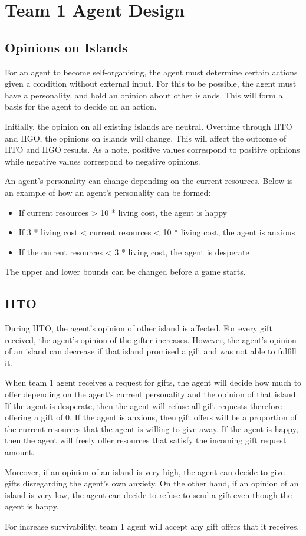 \chapter{Team 1 Agent Design}

\section{Opinions on Islands}
For an agent to become self-organising, the agent must determine certain actions given a condition without external input. For this to be possible, the agent must have a personality, and hold an opinion about other islands. This will form a basis for the agent to decide on an action.

Initially, the opinion on all existing islands are neutral. Overtime through IITO and IIGO, the opinions on islands will change. This will affect the outcome of IITO and IIGO results. As a note, positive values correspond to positive opinions while negative values correspond to negative opinions.

An agent's personality can change depending on the current resources. Below is an example of how an agent's personality can be formed:
\begin{itemize}
    \item If current resources > 10 * living cost, the agent is happy
    \item If 3 * living cost < current resources < 10 * living cost, the agent is anxious
    \item If the current resources < 3 * living cost, the agent is desperate 
\end{itemize}
The upper and lower bounds can be changed before a game starts. 

\section{IITO}
During IITO, the agent's opinion of other island is affected. For every gift received, the agent's opinion of the gifter increases. However, the agent's opinion of an island can decrease if that island promised a gift and was not able to fulfill it. 

When team 1 agent receives a request for gifts, the agent will decide how much to offer depending on the agent's current personality and the opinion of that island. If the agent is desperate, then the agent will refuse all gift requests therefore offering a gift of 0. If the agent is anxious, then gift offers will be a proportion of the current resources that the agent is willing to give away. If the agent is happy, then the agent will freely offer resources that satisfy the incoming gift request amount.

Moreover, if an opinion of an island is very high, the agent can decide to give gifts disregarding the agent's own anxiety. On the other hand, if an opinion of an island is very low, the agent can decide to refuse to send a gift even though the agent is happy. 

For increase survivability, team 1 agent will accept any gift offers that it receives. 